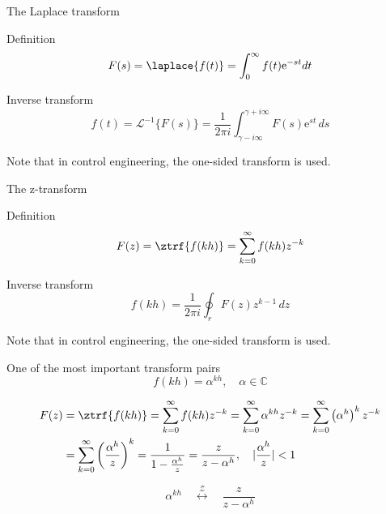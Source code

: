 \documentclass[presentation,aspectratio=169]{beamer}
\begin{document}
\begin{frame}[label={sec:orge0cd654}]{The Laplace transform}
\begin{block}{Definition}
\[ F(s) = \laplace{f(t)} = \int_0^\infty f(t) \mathrm{e}^{-st} dt\]
\end{block}
\begin{block}{Inverse transform}
\[ f(t) = \mathcal{L}^{-1}\{F(s)\} = \frac{1}{2\pi i} \int_{\gamma - i\infty}^{\gamma + i\infty} F(s)\mathrm{e}^{st} \, ds \]

Note that in control engineering, the one-sided transform is used.
\end{block}
\end{frame}

\begin{frame}[label={sec:orge10dd40}]{The z-transform}
\begin{block}{Definition}
\[ F(z) = \ztrf{f(kh)} = \sum_{k=0}^{\infty} f(kh)z^{-k} \]
\end{block}

\begin{block}{Inverse transform}
\[ f(kh) = \frac{1}{2\pi i} \oint_r F(z) z^{k-1} \, dz \]

Note that in control engineering, the one-sided transform is used.
\end{block}
\end{frame}

\begin{frame}[label={sec:org4a4fa5e}]{One of the most important transform pairs}
\[f(kh) = \alpha^{kh}, \quad \alpha \in \mathbb{C}\]

\pause

\begin{align*}
   F(z) &= \ztrf{f(kh)} = \sum_{k=0}^{\infty} f(kh)z^{-k}
   =  \sum_{k=0}^{\infty} \alpha^{kh}z^{-k} =  \sum_{k=0}^{\infty} \left(\alpha^{h}\right)^kz^{-k}\\
   &=  \sum_{k=0}^{\infty} \left(\frac{\alpha^{h}}{z}\right)^{k}
   =  \frac{1}{1 - \frac{\alpha^h}{z}} = \frac{z}{z-\alpha^{h}}, \quad |\frac{\alpha^h}{z}| < 1
\end{align*}

\pause

\begin{tcolorbox}
\[ \alpha^{kh} \quad  \overset{\mathcal{Z}}{\longleftrightarrow} \quad \frac{z}{z-\alpha^h} \]
\end{tcolorbox}
\end{frame}
\end{document}
